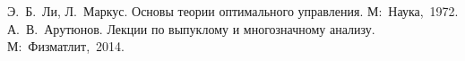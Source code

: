 


        
        
        \tableofcontents

        
        
        
        
        
        \begin{thebibliography}{9}
                Э.~Б.~Ли, Л.~Маркус. Основы теории оптимального управления. М:~Наука,~1972.
                А.~В.~Арутюнов. Лекции по выпуклому и многозначному анализу. М:~Физматлит,~2014.
        \end{thebibliography}
